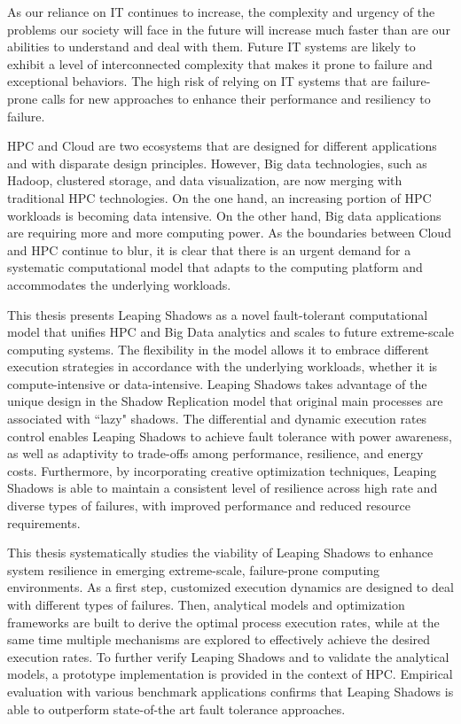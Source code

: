 As our reliance on IT continues to increase, the complexity and urgency of the problems our society will face in the future will increase much faster than are our abilities to understand and deal with them. Future IT systems are likely to exhibit a level of interconnected complexity that makes it prone to failure and exceptional behaviors. The high risk of relying on IT systems that are failure-prone calls for new approaches to enhance their performance and resiliency to failure.

HPC and Cloud are two ecosystems that are designed for different applications and with disparate design principles. However, Big data technologies, such as Hadoop, clustered storage, and data visualization, are now merging with traditional HPC technologies. 
On the one hand, an increasing portion of HPC workloads is becoming data intensive.
On the other hand, Big data applications are requiring more and more computing power. 
As the boundaries between Cloud and HPC continue to blur, it is clear that there is an urgent demand for a systematic computational model that adapts to the computing platform and accommodates the underlying workloads. 

This thesis presents Leaping Shadows as a novel fault-tolerant computational model that unifies HPC and Big Data analytics and scales to future extreme-scale computing systems. The flexibility in the model allows it to embrace different execution strategies in accordance with the underlying workloads, whether it is compute-intensive or data-intensive. Leaping Shadows takes advantage of the unique design in the Shadow Replication model that original main processes are associated with ``lazy" shadows. The differential and dynamic execution rates control enables Leaping Shadows to achieve fault tolerance with power awareness, as well as adaptivity to trade-offs among performance, resilience, and energy costs.  Furthermore, by incorporating creative optimization techniques, Leaping Shadows is able to maintain a consistent level of resilience across high rate and diverse types of failures, with improved performance and reduced resource requirements. 

This thesis systematically studies the viability of Leaping Shadows to enhance system resilience in emerging extreme-scale, failure-prone computing environments. As a first step, customized execution dynamics are designed to deal with different types of failures. Then, analytical models and optimization frameworks are built to derive the optimal process execution rates, while at the same time multiple mechanisms are explored to effectively achieve the desired execution rates. To further verify Leaping Shadows and to validate the analytical models, a prototype implementation is provided in the context of HPC. Empirical evaluation with various benchmark applications confirms that Leaping Shadows is able to outperform state-of-the art fault tolerance approaches. 

